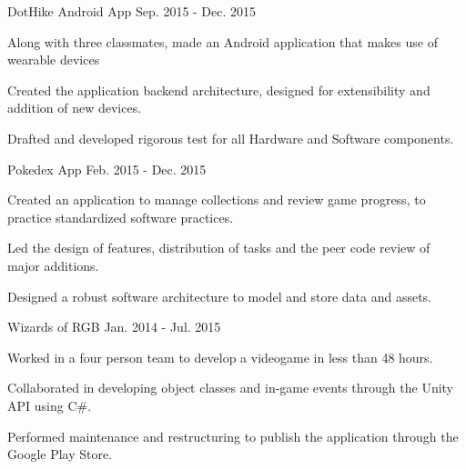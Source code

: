 \begin{cventries}
  \cventry
    {DotHike Android App} %
    {} %
    {} %
    {Sep. 2015 - Dec. 2015} %
    {
      \begin{cvitems} %
        \item {Along with three classmates, made an Android application that makes use of wearable devices}
        \item {Created the application backend architecture, designed for extensibility and addition of new devices.}
        \item {Drafted and developed rigorous test for all Hardware and Software components.}
        \\
      \end{cvitems}
    }
    
  \cventry
    {Pokedex App} %
    {} %
    {} %
    {Feb. 2015 - Dec. 2015} %
    {
      \begin{cvitems} %
        \item {Created an application to manage collections and review game progress, to practice standardized software practices.}
        \item {Led the design of features, distribution of tasks and the peer code review of major additions.}
        \item {Designed a robust software architecture to model and store data and assets.}
        \\
      \end{cvitems}
    } 

  \cventry
    {Wizards of RGB} %
    {} %
    {} %
    {Jan. 2014 - Jul. 2015} %
    {
      \begin{cvitems} %
        \item {Worked in a four person team to develop a videogame in less than 48 hours.}
        \item {Collaborated in developing object classes and in-game events through the Unity API using C\#.}
        \item {Performed maintenance and restructuring to publish the application through the Google Play Store.}
        \\
      \end{cvitems}
    } 

\end{cventries}

